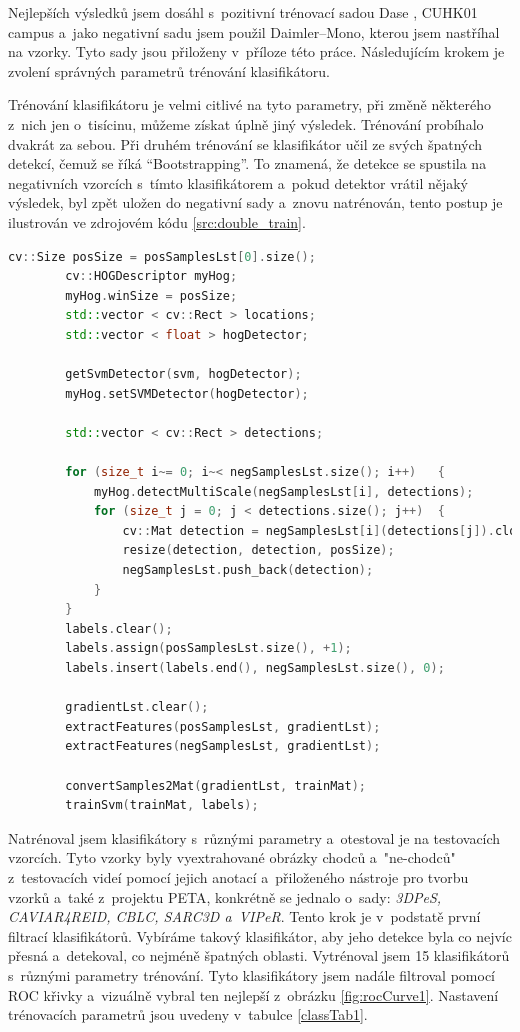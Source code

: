 Nejlepších výsledků jsem dosáhl s~pozitivní trénovací sadou Dase \cite{sudipdas}, CUHK01 campus \cite{cuhk} a~jako negativní sadu jsem použil Daimler--Mono\cite{daimler}, kterou jsem nastříhal na vzorky. Tyto sady jsou přiloženy v~příloze této práce. Následujícím krokem je zvolení správných parametrů trénování klasifikátoru. 

Trénování klasifikátoru je velmi citlivé na tyto parametry, při změně některého z~nich jen o~tisícinu, můžeme získat úplně jiný výsledek. Trénování probíhalo dvakrát za sebou. Při druhém trénování se klasifikátor učil ze svých špatných detekcí, čemuž se říká ``Bootstrapping''. To znamená, že detekce se spustila na negativních vzorcích s~tímto klasifikátorem a~pokud detektor vrátil nějaký výsledek, byl zpět uložen do negativní sady a~znovu natrénován, tento postup je ilustrován ve zdrojovém kódu \ref{src:double_train}.
\newpage

\begin{lstlisting}[label=src:double_train, language=cpp, caption=Bootstrapping]
		cv::Size posSize = posSamplesLst[0].size();
		cv::HOGDescriptor myHog;
		myHog.winSize = posSize;
		std::vector < cv::Rect > locations;
		std::vector < float > hogDetector;
		
		getSvmDetector(svm, hogDetector);
		myHog.setSVMDetector(hogDetector);

		std::vector < cv::Rect > detections;

		for (size_t i~= 0; i~< negSamplesLst.size(); i++)	{
			myHog.detectMultiScale(negSamplesLst[i], detections);
			for (size_t j = 0; j < detections.size(); j++)	{
				cv::Mat detection = negSamplesLst[i](detections[j]).clone();
				resize(detection, detection, posSize);
				negSamplesLst.push_back(detection);
			}
		}
		labels.clear();
		labels.assign(posSamplesLst.size(), +1);
		labels.insert(labels.end(), negSamplesLst.size(), 0);

		gradientLst.clear();
		extractFeatures(posSamplesLst, gradientLst);
		extractFeatures(negSamplesLst, gradientLst);

		convertSamples2Mat(gradientLst, trainMat);
		trainSvm(trainMat, labels);
\end{lstlisting}

Natrénoval jsem klasifikátory s~různými parametry a~otestoval je na testovacích vzorcích. Tyto vzorky byly vyextrahované obrázky chodců a~"ne-chodců" z~testovacích videí pomocí jejich anotací a~přiloženého nástroje pro tvorbu vzorků a~také z~projektu PETA, konkrétně se jednalo o~sady: \textit{3DPeS, CAVIAR4REID, CBLC, SARC3D a~VIPeR}\cite{peta}. Tento krok je v~podstatě první filtrací klasifikátorů. Vybíráme takový klasifikátor, aby jeho detekce byla co nejvíc přesná a~detekoval, co nejméně špatných oblasti. Vytrénoval jsem 15 klasifikátorů s~různými parametry trénování. Tyto klasifikátory jsem nadále filtroval pomocí ROC křivky a~vizuálně vybral ten nejlepší z~obrázku \ref{fig:rocCurve1}.  Nastavení trénovacích parametrů jsou uvedeny v~tabulce \ref{classTab1}.  


